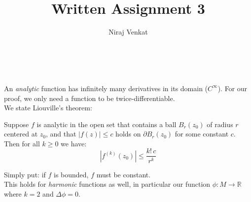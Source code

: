 \documentclass{article}
\def\lap{\Delta}
\def\R{\mathbb{R}}
\def\R{\mathbb{R}}
\begin{document}
\title{Written Assignment 3}

\author{Niraj Venkat}

\date{}

\maketitle

\vspace{.8cm}
\\\\


An \emph{analytic} function has infinitely many derivatives in its domain ($C^\infty$). For our proof, we only need a function to be
twice-differentiable.\\
We state Liouville's theorem:
\begin{mdframed}
    Suppose $f$ is analytic in the open set that contains a ball $B_r(z_0)$ of radius $r$ centered at $z_0$,
    and that $|f(z)| \le c$ holds on $\partial B_r(z_0)$ for some constant $c$. Then for all $k \ge 0$ we have: $$|f^{(k)}(z_0)| \le \frac{k!\,c}{r^k}$$
\end{mdframed}
Simply put: if $f$ is bounded, $f$ must be constant.\\
This holds for \emph{harmonic} functions as well, 
in particular our function $\phi : M \rightarrow \R$ where $k=2$
and $\lap \phi = 0$.\\\\


\vspace{1.8cm}
\\\\
\end{document}
